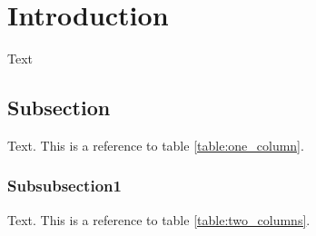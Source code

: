 \section{Introduction}\label{sec:introduction}
Text

\subsection{Subsection}
Text. This is a reference to table \ref{table:one_column}.
\subsubsection{Subsubsection1}
Text. This is a reference to table \ref{table:two_columns}.
